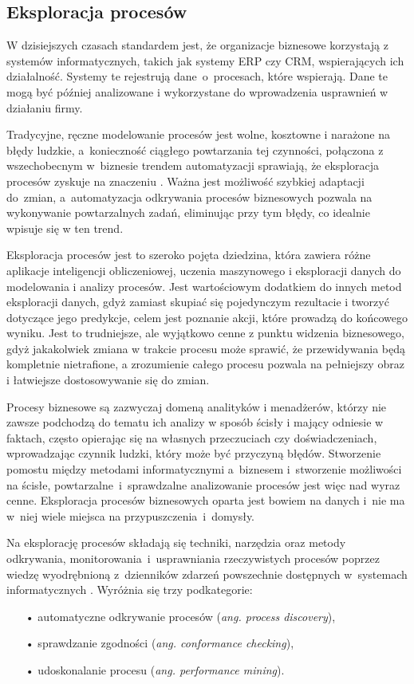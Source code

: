 \subsection{Eksploracja procesów}

W dzisiejszych czasach standardem jest, że organizacje biznesowe korzystają z systemów informatycznych, takich jak systemy ERP czy CRM, wspierających ich działalność. Systemy te rejestrują dane~o~procesach, które wspierają. Dane te mogą być później analizowane i wykorzystane do wprowadzenia usprawnień w działaniu firmy.   

Tradycyjne, ręczne modelowanie procesów jest wolne, kosztowne i narażone na błędy ludzkie, a~konieczność ciągłego powtarzania tej czynności, połączona z wszechobecnym w~biznesie trendem automatyzacji sprawiają, że eksploracja procesów zyskuje na znaczeniu \cite{market-pm}. Ważna jest możliwość szybkiej adaptacji do~zmian, a~automatyzacja odkrywania procesów biznesowych pozwala na wykonywanie powtarzalnych zadań, eliminując przy tym błędy, co idealnie wpisuje się w ten trend.

Eksploracja procesów jest to szeroko pojęta dziedzina, która zawiera różne aplikacje inteligencji obliczeniowej, uczenia maszynowego i eksploracji danych do modelowania i analizy procesów. 
Jest wartościowym dodatkiem do innych metod eksploracji danych, gdyż zamiast skupiać się pojedynczym rezultacie i tworzyć dotyczące jego predykcje, celem jest poznanie akcji, które prowadzą do końcowego wyniku. Jest to trudniejsze, ale wyjątkowo cenne z punktu widzenia biznesowego, gdyż jakakolwiek zmiana w trakcie procesu może sprawić, że przewidywania będą kompletnie nietrafione, a  zrozumienie całego procesu pozwala na pełniejszy obraz i łatwiejsze dostosowywanie się do zmian. 

Procesy biznesowe są zazwyczaj domeną analityków i menadżerów, którzy nie zawsze podchodzą do tematu ich analizy w sposób ścisły i mający odniesie w faktach, często opierając się na własnych przeczuciach czy doświadczeniach, wprowadzając czynnik ludzki, który może być przyczyną błędów. Stworzenie pomostu między metodami informatycznymi a~biznesem i~stworzenie możliwości na ścisłe, powtarzalne~i~sprawdzalne analizowanie procesów jest więc nad wyraz cenne. Eksploracja procesów biznesowych oparta jest bowiem na danych i~nie ma w~niej wiele miejsca na przypuszczenia~i~domysły.

Na eksplorację procesów składają się techniki, narzędzia oraz metody odkrywania, monitorowania~i~usprawniania rzeczywistych procesów poprzez wiedzę wyodrębnioną z~dzienników zdarzeń powszechnie dostępnych w~systemach informatycznych \cite{pm-manifesto, mining-overview}.
Wyróżnia się trzy podkategorie: 
\begin{itemize}
  \item[•] automatyczne odkrywanie procesów (\textit{ang. process discovery}),
  \item[•] sprawdzanie zgodności (\textit{ang. conformance checking}),
  \item[•] udoskonalanie procesu (\textit{ang. performance mining}).
\end{itemize}


